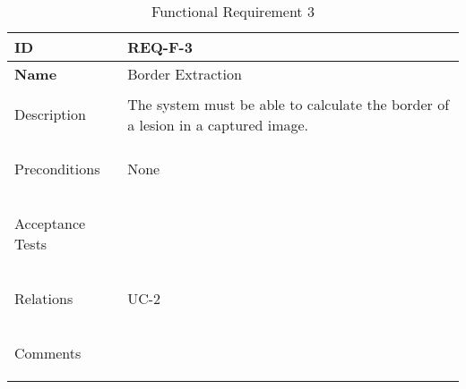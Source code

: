 \begin{table}[H]
    \begin{tabular}[t]{ | >{\bfseries}l | p{9.5cm} |}

    \hline
    ID
    &  REQ-F-3 \\ \hline

    Name
    & Border Extraction \\ \hline

    Description
    &  The system must be able to calculate the border of a lesion in a captured image. \\ \hline

    Preconditions
    & None \\ \hline

    Acceptance Tests
    & \\ \hline

    Relations
    & UC-2 \\ \hline

    Comments
    &  \\ \hline

    \end{tabular}

    \caption{Functional Requirement 3}
    \label{fig:req_f_3}

\end{table}